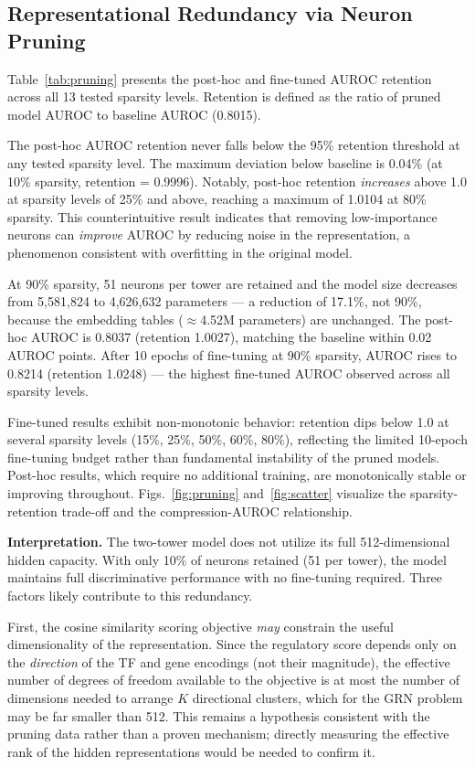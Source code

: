 \documentclass[journal]{IEEEtran}
\begin{document}
\subsection{Representational Redundancy via Neuron Pruning}
\label{ssec:h3}

Table~\ref{tab:pruning} presents the post-hoc and fine-tuned AUROC retention
across all 13 tested sparsity levels. Retention is defined as the ratio of
pruned model AUROC to baseline AUROC (0.8015).

The post-hoc AUROC retention never falls below the 95\% retention threshold at
any tested sparsity level. The maximum deviation below baseline is 0.04\% (at
10\% sparsity, retention = 0.9996). Notably, post-hoc retention \emph{increases}
above 1.0 at sparsity levels of 25\% and above, reaching a maximum of 1.0104
at 80\% sparsity. This counterintuitive result indicates that removing
low-importance neurons can \emph{improve} AUROC by reducing noise in the
representation, a phenomenon consistent with overfitting in the original model.

At 90\% sparsity, 51 neurons per tower are retained and the model size
decreases from 5,581,824 to 4,626,632 parameters --- a reduction of 17.1\%,
not 90\%, because the embedding tables ($\approx$4.52M parameters) are
unchanged. The post-hoc AUROC is 0.8037 (retention 1.0027), matching the
baseline within 0.02 AUROC points. After 10 epochs of fine-tuning at 90\%
sparsity, AUROC rises to 0.8214 (retention 1.0248) --- the highest fine-tuned
AUROC observed across all sparsity levels.

Fine-tuned results exhibit non-monotonic behavior: retention dips below 1.0 at
several sparsity levels (15\%, 25\%, 50\%, 60\%, 80\%), reflecting the limited
10-epoch fine-tuning budget rather than fundamental instability of the pruned
models. Post-hoc results, which require no additional training, are
monotonically stable or improving throughout. Figs.~\ref{fig:pruning}
and~\ref{fig:scatter} visualize the sparsity-retention trade-off and the
compression-AUROC relationship.

\textbf{Interpretation.} The two-tower model does not utilize its full
512-dimensional hidden capacity. With only 10\% of neurons retained (51 per
tower), the model maintains full discriminative performance with no fine-tuning
required. Three factors likely contribute to this redundancy.

First, the cosine similarity scoring objective \emph{may} constrain the useful
dimensionality of the representation. Since the regulatory score depends only
on the \emph{direction} of the TF and gene encodings (not their magnitude),
the effective number of degrees of freedom available to the objective is at
most the number of dimensions needed to arrange $K$ directional clusters, which
for the GRN problem may be far smaller than 512. This remains a hypothesis
consistent with the pruning data rather than a proven mechanism; directly
measuring the effective rank of the hidden representations would be needed to
confirm it.
\end{document}
